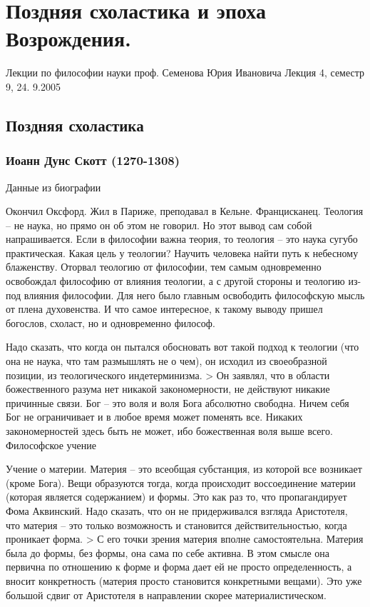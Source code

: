 \section{Поздняя схоластика и эпоха Возрождения.}
Лекции по философии науки проф. Семенова Юрия Ивановича
Лекция 4, семестр 9, 24. 9.2005

\subsection{Поздняя схоластика}
\subsubsection{Иоанн Дунс Скотт (1270-1308)}
Данные из биографии

Окончил Оксфорд. Жил в Париже, преподавал в Кельне. Францисканец. Теология – не наука, но прямо он об этом не говорил. Но этот вывод сам собой напрашивается. Если в философии важна теория, то теология – это наука сугубо практическая. Какая цель у теологии? Научить человека найти путь к небесному блаженству. Оторвал теологию от философии, тем самым одновременно освобождал философию от влияния теологии, а с другой стороны и теологию из-под влияния философии. Для него было главным освободить философскую мысль от плена духовенства. И что самое интересное, к такому выводу пришел богослов, схоласт, но и одновременно философ.

Надо сказать, что когда он пытался обосновать вот такой подход к теологии (что она не наука, что там размышлять не о чем), он исходил из своеобразной позиции, из теологического индетерминизма. > Он заявлял, что в области божественного разума нет никакой закономерности, не действуют никакие причинные связи. Бог – это воля и воля Бога абсолютно свободна. Ничем себя Бог не ограничивает и в любое время может поменять все. Никаких закономерностей здесь быть не может, ибо божественная воля выше всего.
Философское учение

Учение о материи. Материя – это всеобщая субстанция, из которой все возникает (кроме Бога). Вещи образуются тогда, когда происходит воссоединение материи (которая является содержанием) и формы. Это как раз то, что пропагандирует Фома Аквинский. Надо сказать, что он не придерживался взгляда Аристотеля, что материя – это только возможность и становится действительностью, когда проникает форма. > С его точки зрения материя вполне самостоятельна. Материя была до формы, без формы, она сама по себе активна. В этом смысле она первична по отношению к форме и форма дает ей не просто определенность, а вносит конкретность (материя просто становится конкретными вещами). Это уже большой сдвиг от Аристотеля в направлении скорее материалистическом.

